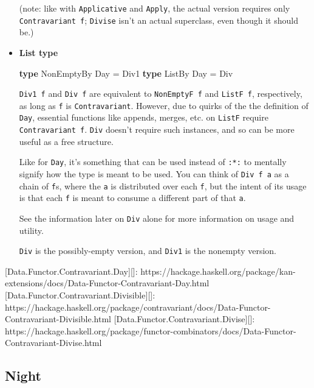 \documentclass[]{article}
\newenvironment{Shaded}{}{}
\newcommand{\DataTypeTok}[1]{\textcolor[rgb]{0.56,0.13,0.00}{#1}}
\newcommand{\KeywordTok}[1]{\textcolor[rgb]{0.00,0.44,0.13}{\textbf{#1}}}
\newcommand{\OtherTok}[1]{\textcolor[rgb]{0.00,0.44,0.13}{#1}}
\begin{document}
\begin{itemize}
  (note: like with \texttt{Applicative} and \texttt{Apply}, the actual version
  requires only \texttt{Contravariant\ f}; \texttt{Divise} isn't an actual
  superclass, even though it should be.)
\item
  \textbf{List type}

\begin{Shaded}
\begin{Highlighting}[]
\KeywordTok{type} \DataTypeTok{NonEmptyBy} \DataTypeTok{Day} \OtherTok{=} \DataTypeTok{Div1}
\KeywordTok{type} \DataTypeTok{ListBy}     \DataTypeTok{Day} \OtherTok{=} \DataTypeTok{Div}
\end{Highlighting}
\end{Shaded}

  \texttt{Div1\ f} and \texttt{Div\ f} are equivalent to \texttt{NonEmptyF\ f}
  and \texttt{ListF\ f}, respectively, as long as \texttt{f} is
  \texttt{Contravariant}. However, due to quirks of the the definition of
  \texttt{Day}, essential functions like appends, merges, etc. on \texttt{ListF}
  require \texttt{Contravariant\ f}. \texttt{Div} doesn't require such
  instances, and so can be more useful as a free structure.

  Like for \texttt{Day}, it's something that can be used instead of \texttt{:*:}
  to mentally signify how the type is meant to be used. You can think of
  \texttt{Div\ f\ a} as a chain of \texttt{f}s, where the \texttt{a} is
  distributed over each \texttt{f}, but the intent of its usage is that each
  \texttt{f} is meant to consume a different part of that \texttt{a}.

  See the information later on \texttt{Div} alone for more information on usage
  and utility.

  \texttt{Div} is the possibly-empty version, and \texttt{Div1} is the nonempty
  version.
\end{itemize}

{[}Data.Functor.Contravariant.Day{]}{[}{]}:
https://hackage.haskell.org/package/kan-extensions/docs/Data-Functor-Contravariant-Day.html
{[}Data.Functor.Contravariant.Divisible{]}{[}{]}:
https://hackage.haskell.org/package/contravariant/docs/Data-Functor-Contravariant-Divisible.html
{[}Data.Functor.Contravariant.Divise{]}{[}{]}:
https://hackage.haskell.org/package/functor-combinators/docs/Data-Functor-Contravariant-Divise.html

\hypertarget{night}{%
\subsection{Night}\label{night}}
\end{document}
